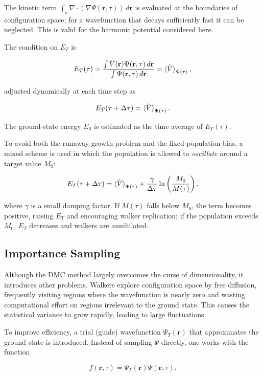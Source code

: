 \documentclass[11pt,a4paper,twoside,pdf]{article}
\numberwithin{equation}{section}
\begin{document}
The kinetic term $\int_{\mathbf{r}} \nabla \cdot (\nabla \Psi(\mathbf{r}, \tau))\, d\mathbf{r}$
is evaluated at the boundaries of configuration space; for a wavefunction that decays
sufficiently fast it can be neglected. This is valid for the harmonic potential
considered here.

The condition on $E_T$ is

$$
    E_T (\tau)= \frac{\int \hat{V} (\mathbf{r}) \Psi(\mathbf{r},  \tau)\, d\mathbf{r}}{\int  \Psi(\mathbf{r},  \tau)\, d\mathbf{r}} = \braket{\hat{V}}_{\Psi (\tau)},
$$

adjusted dynamically at each time step as

$$
    E_T (\tau + \Delta \tau) = \braket{\hat{V}}_{\Psi (\tau)}.
$$

The ground-state energy $E_0$ is estimated as the time average of $E_T(\tau)$.

To avoid both the runaway-growth problem and the fixed-population bias, a
mixed scheme is used in which the population is allowed to \emph{oscillate} around a
target value $M_0$:

$$E_T(\tau + \Delta \tau) = \braket{\hat{V}}_{\Psi(\tau)} + \frac{\gamma}{\Delta \tau} \ln \left( \frac{M_0}{M(\tau)} \right),$$

where $\gamma$ is a small damping factor. If $M(\tau)$ falls below $M_0$,
the term becomes positive, raising $E_T$ and encouraging walker replication;
if the population exceeds $M_0$, $E_T$ decreases and walkers are annihilated.


\subsection{Importance Sampling}
\label{IS}

Although the DMC method largely overcomes the curse of dimensionality, it
introduces other problems. Walkers explore configuration space by free diffusion,
frequently visiting regions where the wavefunction is nearly zero and wasting
computational effort on regions irrelevant to the ground state. This causes the
statistical variance to grow rapidly, leading to large fluctuations.

To improve efficiency, a trial (guide) wavefunction $\Psi_T(\mathbf r)$ that
approximates the ground state is introduced. Instead of sampling $\Psi$ directly,
one works with the function

\begin{equation}
f(\mathbf r,\tau)
=
\Psi_T(\mathbf r)\Psi(\mathbf r,\tau).
\end{equation}
\end{document}
